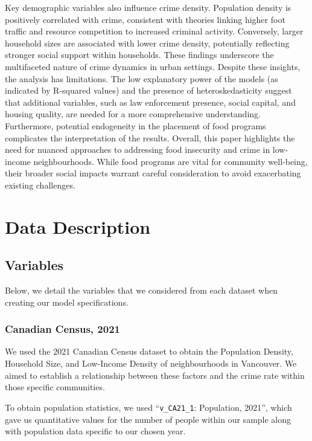 \documentclass[AEJ]{AEA}
\begin{document}
Key demographic variables also influence crime density. Population density is positively correlated with crime, consistent with theories linking higher foot traffic and resource competition to increased criminal activity. Conversely, larger household sizes are associated with lower crime density, potentially reflecting stronger social support within households. These findings underscore the multifaceted nature of crime dynamics in urban settings. Despite these insights, the analysis has limitations. The low explanatory power of the models (as indicated by R-squared values) and the presence of heteroskedasticity suggest that additional variables, such as law enforcement presence, social capital, and housing quality, are needed for a more comprehensive understanding. Furthermore, potential endogeneity in the placement of food programs complicates the interpretation of the results.
Overall, this paper highlights the need for nuanced approaches to addressing food insecurity and crime in low-income neighbourhoods. While food programs are vital for community well-being, their broader social impacts warrant careful consideration to avoid exacerbating existing challenges.

\section{Data Description}

\subsection{Variables}

Below, we detail the variables that we considered from each dataset when creating our model specifications.

\subsubsection{Canadian Census, 2021}

We used the 2021 Canadian Census dataset to obtain the Population Density, Household Size, and Low-Income Density of neighbourhoods in Vancouver. We aimed to establish a relationship between these factors and the crime rate within those specific communities. 

To obtain population statistics, we used ``\texttt{v\_CA21\_1}: Population, 2021'', which gave us quantitative values for the number of people within our sample along with population data specific to our chosen year. 
\end{document}
